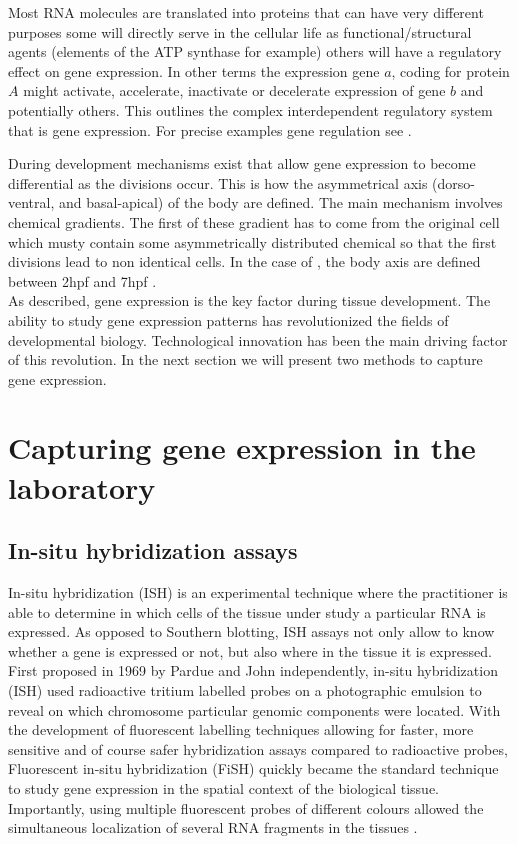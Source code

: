 	Most RNA molecules are translated into proteins that can have very different purposes some will directly serve in the cellular life as functional/structural agents (elements of the ATP synthase for example) others will have a regulatory effect on gene expression. In other terms the expression gene $a$, coding for protein $A$ might activate, accelerate, inactivate or decelerate expression of gene $b$ and potentially others. This outlines the complex interdependent regulatory system that is gene expression. For precise examples gene regulation see \cite{gossen92, shinozaki03,fuqua01,balmer02}.\\
	
	
	During development mechanisms exist that allow gene expression to become differential as the divisions occur. This is how the asymmetrical axis (dorso-ventral, and basal-apical) of the body are defined. The main mechanism involves chemical gradients. The first of these gradient has to come from the original cell which musty contain some asymmetrically distributed chemical so that the first divisions lead to non identical cells. In the case of \platyfull{}, the body axis are defined  between 2hpf and 7hpf \cite{Fischer10}.\\
	
	As described, gene expression is the key factor during tissue development. The ability to study gene expression patterns has revolutionized the fields of developmental biology. Technological innovation has been the main driving factor of this revolution. In the next section we will present two methods to capture gene expression.


\section{Capturing gene expression in the laboratory}
     \subsection{In-situ hybridization assays}
     In-situ hybridization (ISH) is an experimental technique where the practitioner is able to determine in which cells of the tissue under study a particular RNA is expressed. As opposed to Southern blotting, ISH assays not only allow to know whether a gene is expressed or not, but also where in the tissue it is expressed. First proposed in 1969 by Pardue \cite{pardue69} and John \cite{john69} independently, in-situ hybridization (ISH) used radioactive tritium labelled probes on a photographic emulsion to reveal on which chromosome particular genomic components were located. With the development of fluorescent labelling techniques \cite{landegent84,pinkel88} allowing for faster, more sensitive and of course safer hybridization assays \cite{swiger96} compared to radioactive probes, Fluorescent in-situ hybridization (FiSH) quickly became the standard technique to study gene expression in the spatial context of the biological tissue. Importantly, using multiple fluorescent probes of different colours allowed the simultaneous localization of several RNA fragments in the tissues \cite{nederlof89}.
     

